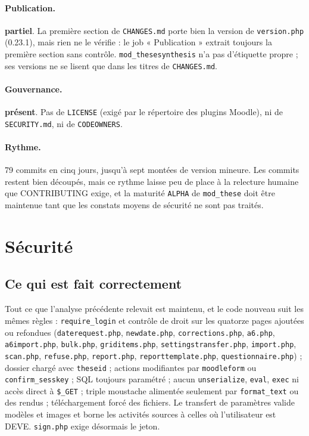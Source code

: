 \documentclass[11pt,a4paper]{article}
\newcommand{\fichier}[1]{\texttt{\small #1}}
\newcommand{\code}[1]{\texttt{#1}}
\newcommand{\partiel}{\textcolor{orange!80!black}{\textbf{partiel}}}
\newcommand{\present}{\textcolor{red!70!black}{\textbf{présent}}}
\begin{document}
\paragraph{Publication.} \partiel. La première section de \fichier{CHANGES.md} porte bien la
version de \code{version.php} (0.23.1), mais rien ne le vérifie : le job « Publication »
extrait toujours la première section sans contrôle. \code{mod\_thesesynthesis} n'a pas
d'étiquette propre ; ses versions ne se lisent que dans les titres de \fichier{CHANGES.md}.

\paragraph{Gouvernance.} \present. Pas de \fichier{LICENSE} (exigé par le répertoire des
plugins Moodle), ni de \fichier{SECURITY.md}, ni de \fichier{CODEOWNERS}.

\paragraph{Rythme.} 79 commits en cinq jours, jusqu'à sept montées de version mineure. Les
commits restent bien découpés, mais ce rythme laisse peu de place à la relecture humaine que
CONTRIBUTING exige, et la maturité \code{ALPHA} de \code{mod\_these} doit être maintenue tant
que les constats moyens de sécurité ne sont pas traités.

\section{Sécurité}\label{sec:securite}

\subsection*{Ce qui est fait correctement}

Tout ce que l'analyse précédente relevait est maintenu, et le code nouveau suit les mêmes règles :
\code{require\_login} et contrôle de droit sur les quatorze pages ajoutées ou refondues
(\fichier{daterequest.php}, \fichier{newdate.php}, \fichier{corrections.php}, \fichier{a6.php},
\fichier{a6import.php}, \fichier{bulk.php}, \fichier{griditems.php},
\fichier{settingstransfer.php}, \fichier{import.php}, \fichier{scan.php}, \fichier{refuse.php},
\fichier{report.php}, \fichier{reporttemplate.php}, \fichier{questionnaire.php}) ; dossier chargé
avec \code{theseid} ; actions modifiantes par \code{moodleform} ou \code{confirm\_sesskey} ; SQL
toujours paramétré ; aucun \code{unserialize}, \code{eval}, \code{exec} ni accès direct à
\code{\$\_GET} ; triple moustache alimentée seulement par \code{format\_text} ou des rendus ;
téléchargement forcé des fichiers. Le transfert de paramètres valide modèles et images et borne
les activités sources à celles où l'utilisateur est DEVE. \fichier{sign.php} exige désormais le
jeton.
\end{document}
